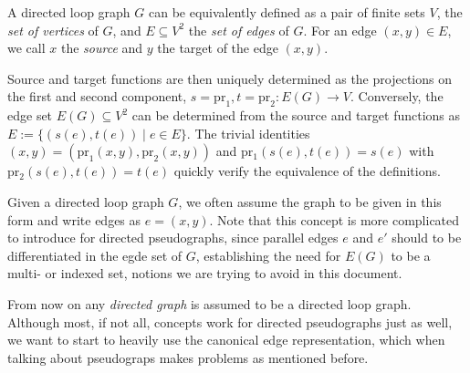 \begin{remark}

  A directed loop graph $G$ can be equivalently defined as a pair of
  finite sets $V$, the \textit{set of vertices} of
  $G$, and $E \subseteq V^2$ the \textit{set of edges} of $G$. For an
  edge $(x,y) \in E$, we call $x$ the \textit{source} and $y$ the
  target of the edge $(x,y)$.

  Source and target functions are then uniquely determined as the
  projections on the first and second component, $s = \mathrm{pr}_1, t
  = \mathrm{pr}_2: E(G) \to V.$ Conversely, the edge set $E(G)
  \subseteq V^2$ can be determined from the source and target
  functions as $E:=\{(s(e),t(e)) \mid e \in E\}$. The trivial identities
  $(x,y) = (\mathrm{pr}_1(x,y),\mathrm{pr}_2(x,y))$ and
  $\mathrm{pr_1}(s(e), t(e)) = s(e)$ with $\mathrm{pr_2}(s(e), t(e)) =
  t(e)$ quickly verify the equivalence of the definitions.

  Given a directed loop graph $G$, we often assume the graph to be
  given in this form and write edges as $e=(x,y)$. Note that this
  concept is more complicated to introduce for directed pseudographs,
  since parallel edges $e$ and $e'$ should to be differentiated in the
  egde set of $G$, establishing the need for $E(G)$ to be a multi- or
  indexed set, notions we are trying to avoid in this document.

\end{remark}






From now on any \textit{directed graph} is assumed to be a directed
loop graph. Although most, if not all, concepts work for directed
pseudographs just as well, we want to start to heavily use the
canonical edge representation, which when talking about pseudograps
makes problems as mentioned before.

